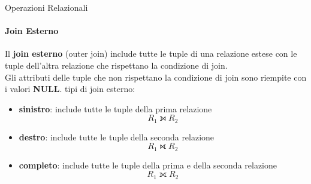     \begin{frame}{Operazioni Relazionali}
        \framesubtitle{Join Esterno}
        Il \textbf{join esterno} (outer join) include tutte le tuple di una relazione estese con le tuple dell'altra relazione che rispettano la condizione di join.
        \\Gli attributi delle tuple che non rispettano la condizione di join sono riempite con i valori \textbf{NULL}.
         tipi di join esterno:
        \begin{itemize}
            \item \textbf{sinistro}: include tutte le tuple della prima relazione
            \[R_1 \leftouterjoin R_2\]
            \item \textbf{destro}: include tutte le tuple della seconda relazione
            \[R_1\rightouterjoin R_2\]
            \item \textbf{completo}: include tutte le tuple della prima e della seconda relazione
            \[R_1\fullouterjoin R_2\]
        \end{itemize}
    \end{frame}
